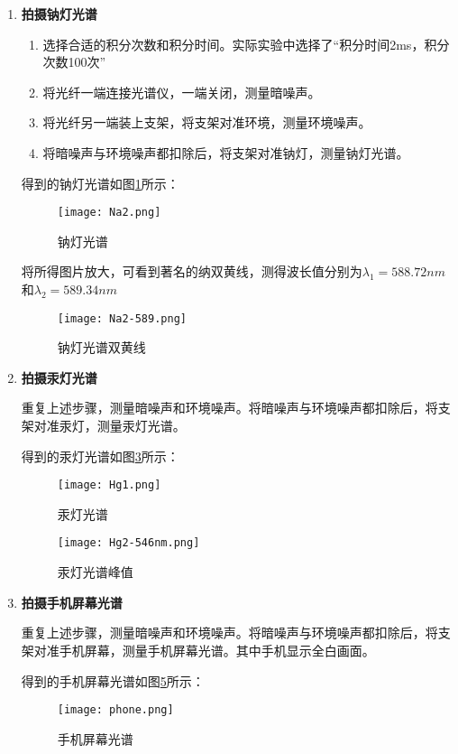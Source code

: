 \documentclass[dvipsnames, svgnames,a4paper,11pt]{article}
\begin{document}
		\begin{enumerate}
			\item \textbf{拍摄钠灯光谱}
				\begin{enumerate}
					\item 选择合适的积分次数和积分时间。实际实验中选择了“积分时间2ms，积分次数100次”
					
					\item 将光纤一端连接光谱仪，一端关闭，测量暗噪声。 
					
					\item 将光纤另一端装上支架，将支架对准环境，测量环境噪声。
					
					\item 将暗噪声与环境噪声都扣除后，将支架对准钠灯，测量钠灯光谱。
					
				\end{enumerate}
				
				得到的钠灯光谱如图\ref{fig:Na2}所示：
				
				\begin{figure}[htbp]
					\centering
					\texttt{[image: Na2.png]}
					\caption{钠灯光谱}
					\label{fig:Na2}
				\end{figure}
				
				将所得图片放大，可看到著名的纳双黄线，测得波长值分别为$\lambda_1=588.72nm$和$\lambda_2=589.34nm$
				
				\begin{figure}[htbp]
					\centering
					\texttt{[image: Na2-589.png]}
					\caption{钠灯光谱双黄线}
					\label{fig:Na2-589}
				\end{figure}
				
			\item \textbf{拍摄汞灯光谱}
			
				重复上述步骤，测量暗噪声和环境噪声。将暗噪声与环境噪声都扣除后，将支架对准汞灯，测量汞灯光谱。
				
				
				得到的汞灯光谱如图\ref{fig:Hg1}所示：
				
				\begin{figure}[htbp]
					\centering
					\texttt{[image: Hg1.png]}
					\caption{汞灯光谱}
					\label{fig:Hg1}
				\end{figure}
				
				\begin{figure}[htbp]
					\centering
					\texttt{[image: Hg2-546nm.png]}
					\caption{汞灯光谱峰值}
					\label{fig:Hg2-546}
				\end{figure}
				
			\item \textbf{拍摄手机屏幕光谱}
			
				重复上述步骤，测量暗噪声和环境噪声。将暗噪声与环境噪声都扣除后，将支架对准手机屏幕，测量手机屏幕光谱。其中手机显示全白画面。
				
				得到的手机屏幕光谱如图\ref{fig:phone}所示：
				
				\begin{figure}[htbp]
					\centering
					\texttt{[image: phone.png]}
					\caption{手机屏幕光谱}
					\label{fig:phone}
				\end{figure}
		\end{enumerate}
		
\end{document}
